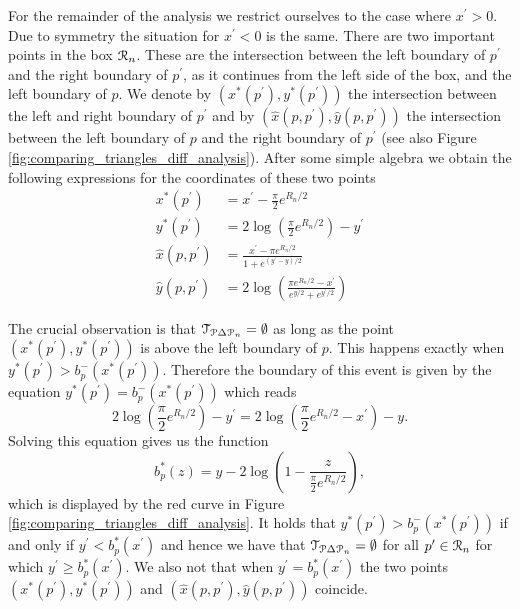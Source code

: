 For the remainder of the analysis we restrict ourselves to the case where $x^\prime > 0$. Due to symmetry the situation for $x^\prime < 0$ is the same. There are two important points in the box ${\mathcal R}_n$. These are the intersection between the left boundary of $p^\prime$ and the right boundary of $p^\prime$, as it continues from the left side of the box, and the left boundary of $p$. We denote by $(x^\ast(p^\prime), y^\ast(p^\prime))$ the intersection between the left and right boundary of $p^\prime$ and by $(\hat{x}(p,p^\prime), \hat{y}(p,p^\prime))$ the intersection between the left boundary of $p$ and the right boundary of $p^\prime$ (see also Figure \ref{fig:comparing_triangles_diff_analysis}). After some simple algebra we obtain the following expressions for the coordinates of these two points
\begin{align*}
	x^\ast(p^\prime) &= x^\prime - \frac{\pi}{2} e^{R_n/2}\\
	y^\ast(p^\prime) &= 2\log\left(\frac{\pi}{2}e^{R_n/2}\right) - y^\prime\\
	\hat{x}(p,p^\prime) &= \frac{x^\prime - \pi e^{R_n/2}}{1 + e^{(y^\prime - y)/2}} \\
	\hat{y}(p,p^\prime) &= 2 \log\left(\frac{\pi e^{R_n/2} - x^\prime}{e^{y/2} + e^{y^\prime/2}}\right)
\end{align*}

The crucial observation is that $\mathcal{T}_{{\mathcal P} \Delta {\mathcal P}_n} = \emptyset$ as long as the point $(x^\ast(p^\prime), y^\ast(p^\prime))$ is above the left boundary of $p$. This happens exactly when $y^\ast(p^\prime) > b_p^-(x^\ast(p^\prime))$. Therefore the boundary of this event is given by the equation $y^\ast(p^\prime) = b_p^-(x^\ast(p^\prime))$ which reads
\[
	2\log\left(\frac{\pi}{2}e^{R_n/2}\right) - y^\prime = 2\log\left(\frac{\pi}{2} e^{R_n/2} -x^\prime\right) - y.
\]
Solving this equation gives us the function
\begin{equation}
	b^\ast_p(z) = y - 2\log\left(1 - \frac{z}{\frac{\pi}{2} e^{R_n/2}}\right),
\end{equation}
which is displayed by the red curve in Figure \ref{fig:comparing_triangles_diff_analysis}. It holds that $y^\ast(p^\prime) > b_p^-(x^\ast(p^\prime))$ if and only if $y^\prime < b^\ast_p(x^\prime)$ and hence we have that $\mathcal{T}_{{\mathcal P} \Delta {\mathcal P}_n} = \emptyset$ for all $p^\prime \in {\mathcal R}_n$ for which $y^\prime \ge b^\ast_p(x^\prime)$. We also not that when $y^\prime = b^\ast_p(x^\prime)$ the two points $(x^\ast(p^\prime), y^\ast(p^\prime))$ and $(\hat{x}(p,p^\prime),\hat{y}(p,p^\prime))$ coincide.




